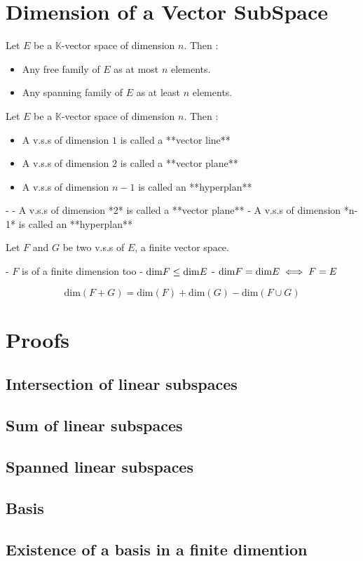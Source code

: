 \documentclass[notitlepage]{math}
\begin{document}
\section{Dimension of a Vector SubSpace}
Let $E$ be a $\mathbb{K}$-vector space of dimension $n$. Then :
\begin{itemize}
    \item Any free family of $E$ as at most $n$ elements.
    \item Any spanning family of $E$ as at least $n$ elements.
\end{itemize}
Let $E$ be a $\mathbb{K}$-vector space of dimension $n$. Then :\\
\begin{itemize}
    \item A v.s.s of dimension $1$ is called a **vector line**
    \item A v.s.s of dimension $2$ is called a **vector plane**
    \item A v.s.s of dimension $n-1$ is called an **hyperplan**
\end{itemize}
- 
- A v.s.s of dimension *2* is called a **vector plane**
- A v.s.s of dimension *n-1* is called an **hyperplan**

Let $F$ and $G$ be two v.s.s of $E$, a finite vector space.

- $F$ is of a finite dimension too
- $\text{dim}\space F \leq \text{dim}\space E$
- $\text{dim}\space F = \text{dim}\space E \iff F = E$

\[\text{dim}(F + G)  = \text{dim}(F) + \text{dim}(G) - \text{dim}(F \cup G)\]
\section{Proofs}
\subsection{Intersection of linear subspaces}
\subsection{Sum of linear subspaces}
\subsection{Spanned linear subspaces}
\subsection{Basis}
\subsection{Existence of a basis in a finite dimention}
\end{document}
